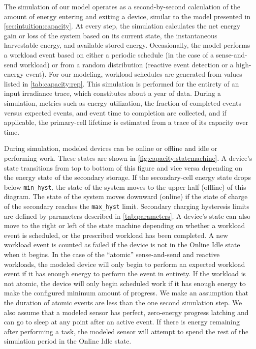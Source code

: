 The simulation of our model operates as a second-by-second calculation of the
amount of energy entering and exiting a device, similar to the model presented in \cref{sec:intuition:capacity}.
At every step, the simulation calculates the net energy gain or loss of the
system based on its current state, the instantaneous harvestable energy, and available stored energy.  
Occasionally,
the model performs a workload event based on either a periodic schedule (in the
case of a sense-and-send workload) or from a random distribution (reactive
event detection or a high-energy event). For our modeling, workload schedules
are generated from values listed in \cref{tab:capacity:rep}.
This simulation is performed for the entirety of an
input irradiance trace, which constitutes about a year of data. During
a simulation, metrics such as energy utilization, the fraction of completed
events versus expected events, and event time to completion are collected,
and if applicable, the primary-cell lifetime is estimated from a trace of its capacity over time.


During simulation, modeled devices can be online or offline and idle or performing
work. These states are shown in \cref{fig:capacity:statemachine}.  A device's state
transitions from top to bottom of this figure and vice versa depending on the
energy state of the secondary storage.
If the secondary-cell energy state drops below \texttt{min\_hyst},
the state of the system moves to the upper
half (\textsf{offline}) of this diagram. The state of the system moves downward (\textsf{online})
if the state of charge of the secondary reaches the \texttt{max\_hyst}
limit. 
Secondary charging hysteresis limits are defined by parameters described in \cref{tab:parameters}.
A device's state can also move
to the right or left of the state machine depending on whether a workload event
is scheduled, or the prescribed workload has been completed. A new
workload event is counted as failed if the device is not in the \textsf{Online
Idle} state when it begins.
In the case of the ``atomic''
sense-and-send and reactive workloads, the modeled device will only begin
to perform an expected workload event if it has
enough energy to perform the event in entirety. If the workload is not atomic,
the device will only begin scheduled work if it has enough energy to make the
configured minimum amount of progress. We
make an assumption that the duration of atomic events are less than the one
second simulation step.
We also assume that a modeled sensor has perfect, zero-energy progress
latching and can go to sleep at any point after an active event. 
If there is energy remaining after performing a task, the modeled sensor will
attempt to spend the rest of the simulation period in the \textsf{Online Idle} state.

